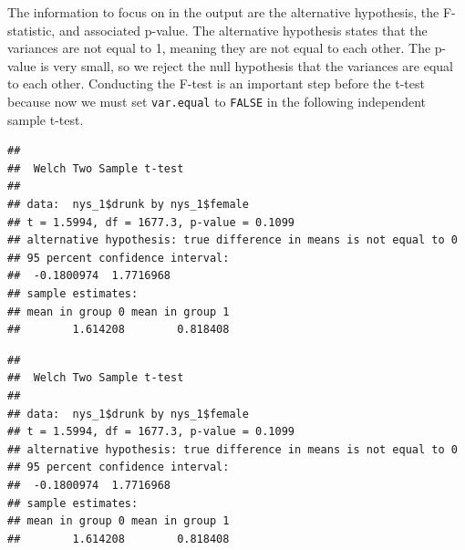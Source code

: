 \documentclass[
]{book}
\newenvironment{Shaded}{\begin{snugshade}}{\end{snugshade}}
\newcommand{\AttributeTok}[1]{\textcolor[rgb]{0.77,0.63,0.00}{#1}}
\newcommand{\CommentTok}[1]{\textcolor[rgb]{0.56,0.35,0.01}{\textit{#1}}}
\newcommand{\ConstantTok}[1]{\textcolor[rgb]{0.00,0.00,0.00}{#1}}
\newcommand{\FunctionTok}[1]{\textcolor[rgb]{0.00,0.00,0.00}{#1}}
\newcommand{\NormalTok}[1]{#1}
\newcommand{\OtherTok}[1]{\textcolor[rgb]{0.56,0.35,0.01}{#1}}
\newcommand{\SpecialCharTok}[1]{\textcolor[rgb]{0.00,0.00,0.00}{#1}}
\begin{document}
The information to focus on in the output are the alternative hypothesis, the F-statistic, and associated p-value. The alternative hypothesis states that the variances are not equal to 1, meaning they are not equal to each other. The p-value is very small, so we reject the null hypothesis that the variances are equal to each other. Conducting the F-test is an important step before the t-test because now we must set \texttt{var.equal} to \texttt{FALSE} in the following independent sample t-test.

\begin{Shaded}
\end{Shaded}

\begin{verbatim}
## 
##  Welch Two Sample t-test
## 
## data:  nys_1$drunk by nys_1$female
## t = 1.5994, df = 1677.3, p-value = 0.1099
## alternative hypothesis: true difference in means is not equal to 0
## 95 percent confidence interval:
##  -0.1800974  1.7716968
## sample estimates:
## mean in group 0 mean in group 1 
##        1.614208        0.818408
\end{verbatim}

\begin{Shaded}
\end{Shaded}

\begin{verbatim}
## 
##  Welch Two Sample t-test
## 
## data:  nys_1$drunk by nys_1$female
## t = 1.5994, df = 1677.3, p-value = 0.1099
## alternative hypothesis: true difference in means is not equal to 0
## 95 percent confidence interval:
##  -0.1800974  1.7716968
## sample estimates:
## mean in group 0 mean in group 1 
##        1.614208        0.818408
\end{verbatim}
\end{document}
